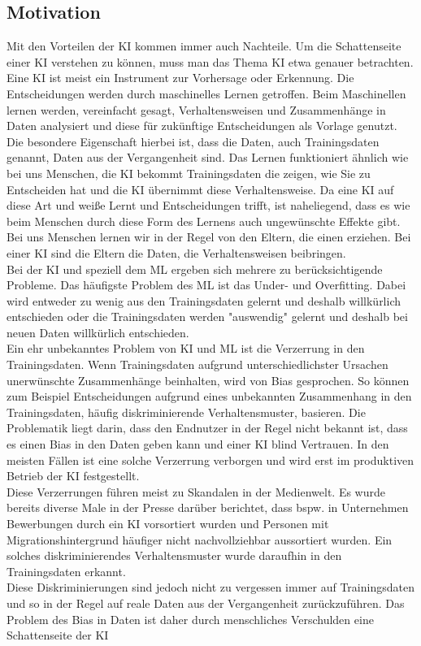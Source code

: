 \begin{onehalfspace}
        \newpage
        \section{Motivation}
        \label{subsec:motivation}
            Mit den Vorteilen der \ac*{KI} kommen immer auch Nachteile. Um die Schattenseite einer \ac*{KI} verstehen zu können, muss man das Thema \ac*{KI} etwa genauer betrachten. Eine \ac*{KI} ist meist ein Instrument zur Vorhersage oder Erkennung. Die Entscheidungen werden durch maschinelles Lernen getroffen. Beim Maschinellen lernen werden, vereinfacht gesagt, Verhaltensweisen und Zusammenhänge in Daten analysiert und diese für zukünftige Entscheidungen als Vorlage genutzt. Die besondere Eigenschaft hierbei ist, dass die Daten, auch Trainingsdaten genannt, Daten aus der Vergangenheit sind. Das Lernen funktioniert ähnlich wie bei uns Menschen, die \ac*{KI} bekommt Trainingsdaten die zeigen, wie Sie zu Entscheiden hat und die \ac*{KI} übernimmt diese Verhaltensweise. Da eine \ac*{KI} auf diese Art und weiße Lernt und Entscheidungen trifft, ist naheliegend, dass es wie beim Menschen durch diese Form des Lernens auch ungewünschte Effekte gibt. Bei uns Menschen lernen wir in der Regel von den Eltern, die einen erziehen. Bei einer \ac*{KI} sind die Eltern die Daten, die Verhaltensweisen beibringen. 
            \\
            Bei der \ac*{KI} und speziell dem \ac*{ML} ergeben sich mehrere zu berücksichtigende Probleme. Das häufigste Problem des \ac*{ML} ist das Under- und Overfitting. Dabei wird entweder zu wenig aus den Trainingsdaten gelernt und deshalb willkürlich entschieden oder die Trainingsdaten werden "auswendig" gelernt und deshalb bei neuen Daten willkürlich entschieden. 
            \\
            Ein ehr unbekanntes Problem von \ac*{KI} und \ac*{ML} ist die Verzerrung in den Trainingsdaten. Wenn Trainingsdaten aufgrund unterschiedlichster Ursachen unerwünschte Zusammenhänge beinhalten, wird von Bias gesprochen. So können zum Beispiel Entscheidungen aufgrund eines unbekannten Zusammenhang in den Trainingsdaten, häufig diskriminierende Verhaltensmuster, basieren. Die Problematik liegt darin, dass den Endnutzer in der Regel nicht bekannt ist, dass es einen Bias in den Daten geben kann und einer \ac*{KI} blind Vertrauen. In den meisten Fällen ist eine solche Verzerrung verborgen und wird erst im produktiven Betrieb der \ac*{KI} festgestellt.
            \\
            Diese Verzerrungen führen meist zu Skandalen in der Medienwelt. Es wurde bereits diverse Male in der Presse darüber berichtet, dass bspw. in Unternehmen Bewerbungen durch ein \ac*{KI} vorsortiert wurden und Personen mit Migrationshintergrund häufiger nicht nachvollziehbar aussortiert wurden. Ein solches diskriminierendes Verhaltensmuster wurde daraufhin in den Trainingsdaten erkannt.
            \\
            Diese Diskriminierungen sind jedoch nicht zu vergessen immer auf Trainingsdaten und so in der Regel auf reale Daten aus der Vergangenheit zurückzuführen. Das Problem des Bias in Daten ist daher durch menschliches Verschulden eine Schattenseite der \ac*{KI} 


\end{onehalfspace}
